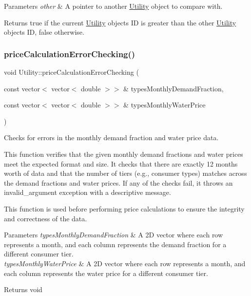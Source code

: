 \begin{DoxyParams}{Parameters}
{\em other} & A pointer to another \mbox{\hyperlink{classUtility}{Utility}} object to compare with.\\
\hline
\end{DoxyParams}
\begin{DoxyReturn}{Returns}
true if the current \mbox{\hyperlink{classUtility}{Utility}} object\textquotesingle{}s ID is greater than the other \mbox{\hyperlink{classUtility}{Utility}} object\textquotesingle{}s ID, false otherwise. 
\end{DoxyReturn}
\mbox{\label{classUtility_a01ec91140b9d23bf5b03e0fc55bced0d}} 
\subsubsection{\texorpdfstring{price\+Calculation\+Error\+Checking()}{priceCalculationErrorChecking()}}
{\footnotesize\ttfamily void Utility\+::price\+Calculation\+Error\+Checking (\begin{DoxyParamCaption}\item[{const vector$<$ vector$<$ double $>$$>$ \&}]{types\+Monthly\+Demand\+Fraction,  }\item[{const vector$<$ vector$<$ double $>$$>$ \&}]{types\+Monthly\+Water\+Price }\end{DoxyParamCaption})}



Checks for errors in the monthly demand fraction and water price data. 

This function verifies that the given monthly demand fractions and water prices meet the expected format and size. It checks that there are exactly 12 months\textquotesingle{} worth of data and that the number of tiers (e.\+g., consumer types) matches across the demand fractions and water prices. If any of the checks fail, it throws an invalid\+\_\+argument exception with a descriptive message.

This function is used before performing price calculations to ensure the integrity and correctness of the data.


\begin{DoxyParams}{Parameters}
{\em types\+Monthly\+Demand\+Fraction} & A 2D vector where each row represents a month, and each column represents the demand fraction for a different consumer tier.\\
\hline
{\em types\+Monthly\+Water\+Price} & A 2D vector where each row represents a month, and each column represents the water price for a different consumer tier.\\
\hline
\end{DoxyParams}
\begin{DoxyReturn}{Returns}
void 
\end{DoxyReturn}

